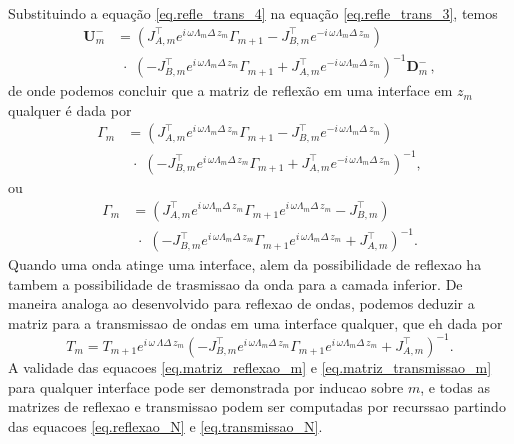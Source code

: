 Substituindo a equa\c{c}\~ao \ref{eq.refle_trans_4} na equa\c{c}\~ao \ref{eq.refle_trans_3}, temos
\begin{align*}
\mathbf{U}_m^-&=(J^\top_{A,m}e^{i\,\omega\Lambda_m\Delta\,z_m}\Gamma_{m+1}-J^\top_{B,m}e^{-i\,\omega\Lambda_m\Delta\,z_m})\\
&\,\,\cdot\,\,(-J^\top_{B,m}e^{i\,\omega\Lambda_m\Delta\,z_m}\Gamma_{m+1}+J^\top_{A,m}e^{-i\,\omega\Lambda_m\Delta\,z_m})^{-1}\mathbf{D}_m^-\,,
\end{align*}
de onde podemos concluir que a matriz de reflex\~ao em uma interface em $z_m$ qualquer \'e dada por
\begin{align*}
\Gamma_{m}&=(J^\top_{A,m}e^{i\,\omega\Lambda_m\Delta\,z_m}\Gamma_{m+1}-J^\top_{B,m}e^{-i\,\omega\Lambda_m\Delta\,z_m})\\
&\,\,\cdot\,\,(-J^\top_{B,m}e^{i\,\omega\Lambda_m\Delta\,z_m}\Gamma_{m+1}+J^\top_{A,m}e^{-i\,\omega\Lambda_m\Delta\,z_m})^{-1},
\end{align*}
ou
\begin{align}\nonumber
\Gamma_{m}&=(J^\top_{A,m}e^{i\,\omega\Lambda_m\Delta\,z_m}\Gamma_{m+1}e^{i\,\omega\Lambda_m\Delta\,z_m}-J^\top_{B,m})\\\label{eq.matriz_reflexao_m}
&\,\,\cdot\,\,(-J^\top_{B,m}e^{i\,\omega\Lambda_m\Delta\,z_m}\Gamma_{m+1}e^{i\,\omega\Lambda_m\Delta\,z_m}+J^\top_{A,m})^{-1}.
\end{align}
Quando uma onda atinge uma interface, alem da possibilidade de reflexao ha tambem a possibilidade de trasmissao da onda para a camada inferior. De maneira analoga ao desenvolvido para reflexao de ondas, podemos deduzir a matriz para a transmissao de ondas em uma interface qualquer, que eh dada por
\begin{equation}\label{eq.matriz_transmissao_m}
T_m=T_{m+1}e^{i\,\omega\,\Lambda\Delta\,z_m}(-J^\top_{B,m}e^{i\,\omega\Lambda_m\Delta\,z_m}\Gamma_{m+1}e^{i\,\omega\Lambda_m\Delta\,z_m}+J^\top_{A,m})^{-1}.
\end{equation}
A validade das equacoes \ref{eq.matriz_reflexao_m} e \ref{eq.matriz_transmissao_m} para qualquer interface pode ser demonstrada por inducao sobre $m$, e todas as matrizes de reflexao e transmissao podem ser computadas por recurssao partindo das equacoes \ref{eq.reflexao_N} e \ref{eq.transmissao_N}.





